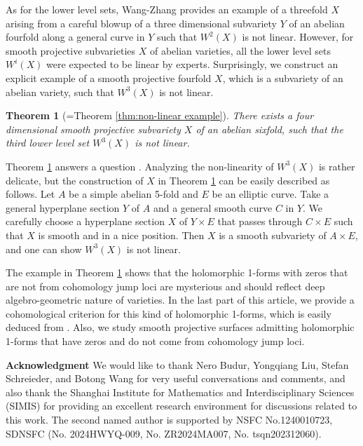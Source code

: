 \documentclass[a4paper,12pt,reqno]{amsart}
\newtheorem{theorem}{Theorem}[section]
\theoremstyle{question}
\theoremstyle{definition}
\theoremstyle{remark}
\theoremstyle{cited}
\theoremstyle{citeddef}
\begin{document}
As for the lower level sets, Wang-Zhang \cite{WZ25} provides an example of a threefold $X$ arising from a careful blowup of a three dimensional subvariety $Y$ of an abelian fourfold along a general curve in $Y$ such that $W^2(X)$ is not linear. However, for smooth projective subvarieties $X$ of abelian varieties, all the lower level sets $W^i(X)$ were expected to be linear by experts. Surprisingly, we construct an explicit example of a smooth projective fourfold $X$, which is a subvariety of an abelian variety, such that $W^3(X)$ is not linear.

\begin{theorem}[{=Theorem \ref{thm:non-linear example}}]\label{main-thm:nonlinear-ex}
There exists a four dimensional smooth projective subvariety $X$ of an abelian sixfold, such that the third lower level set $W^3(X)$ is not linear.
\end{theorem}

Theorem \ref{main-thm:nonlinear-ex} answers a question \cite[Question 1.10]{DHL24}. Analyzing the non-linearity of $W^3(X)$ is rather delicate, but the construction of $X$ in Theorem \ref{main-thm:nonlinear-ex} can be easily described as follows. Let $A$ be a simple abelian 5-fold and $E$ be an elliptic curve. Take a general hyperplane section $Y$ of $A$ and a general smooth curve $C$ in $Y$. We carefully choose a hyperplane section $X$ of $Y\times E$ that passes through $C\times E$ such that $X$ is smooth and in a nice position. Then $X$ is a smooth subvariety of $A\times E$, and one can show $W^3(X)$ is not linear. 

The example in Theorem \ref{main-thm:nonlinear-ex} shows that the holomorphic 1-forms with zeros that are not from cohomology jump loci are mysterious and should reflect deep algebro-geometric nature of varieties. In the last part of this article, we provide a cohomological criterion for this kind of holomorphic 1-forms, which is easily deduced from \cite{GL87}. Also, we study smooth projective surfaces admitting holomorphic 1-forms that have zeros and do not come from cohomology jump loci.



\noindent \textbf{Acknowledgment} We would like to thank Nero Budur, Yongqiang Liu, Stefan Schreieder, and Botong Wang for very useful conversations and comments, and also thank the Shanghai Institute for Mathematics and Interdisciplinary Sciences (SIMIS) for providing an excellent research environment for discussions related to this work. The second named author is supported by NSFC No.1240010723, SDNSFC (No. 2024HWYQ-009, No. ZR2024MA007, No. tsqn202312060).
\end{document}
